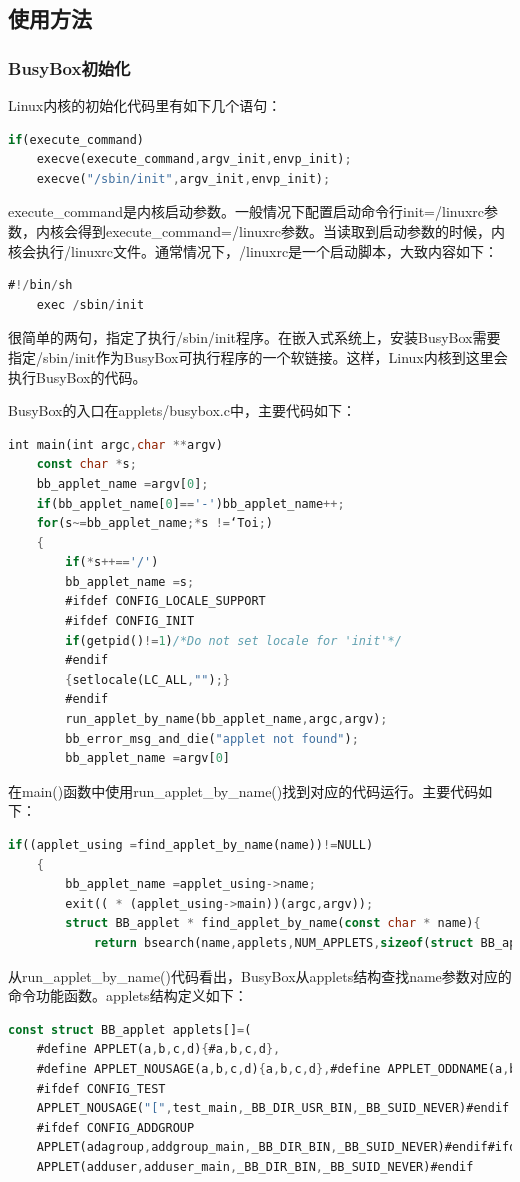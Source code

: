 \subsection{使用方法}
\subsubsection{BusyBox初始化}
Linux内核的初始化代码里有如下几个语句：
\begin{lstlisting}[language=Rust]
	if(execute_command)
	execve(execute_command,argv_init,envp_init);
	execve("/sbin/init",argv_init,envp_init);
\end{lstlisting}

execute\_command是内核启动参数。一般情况下配置启动命令行init=/linuxrc参数，内核会得到execute\_command=/linuxrc参数。当读取到启动参数的时候，内核会执行/linuxrc文件。通常情况下，/linuxrc是一个启动脚本，大致内容如下：
\begin{lstlisting}[language=Rust]
	#!/bin/sh
	exec /sbin/init
\end{lstlisting}

很简单的两句，指定了执行/sbin/init程序。在嵌入式系统上，安装BusyBox需要指定/sbin/init作为BusyBox可执行程序的一个软链接。这样，Linux内核到这里会执行BusyBox的代码。

BusyBox的入口在applets/busybox.c中，主要代码如下：
\begin{lstlisting}[language=Rust]
	int main(int argc,char **argv)
	const char *s;
	bb_applet_name =argv[0];
	if(bb_applet_name[0]=='-')bb_applet_name++;
	for(s~=bb_applet_name;*s !=‘Toi;)
	{
		if(*s++=='/')
		bb_applet_name =s;
		#ifdef CONFIG_LOCALE_SUPPORT
		#ifdef CONFIG_INIT
		if(getpid()!=1)/*Do not set locale for 'init'*/
		#endif
		{setlocale(LC_ALL,"");}
		#endif
		run_applet_by_name(bb_applet_name,argc,argv);
		bb_error_msg_and_die("applet not found");
		bb_applet_name =argv[0]
\end{lstlisting}

在main()函数中使用run\_applet\_by\_name()找到对应的代码运行。主要代码如下：
\begin{lstlisting}[language=Rust]
	if((applet_using =find_applet_by_name(name))!=NULL)
	{
		bb_applet_name =applet_using->name;
		exit(( * (applet_using->main))(argc,argv));
		struct BB_applet * find_applet_by_name(const char * name){
			return bsearch(name,applets,NUM_APPLETS,sizeof(struct BB_applet),applet_name_compare);
\end{lstlisting}

从run\_applet\_by\_name()代码看出，BusyBox从applets结构查找name参数对应的命令功能函数。applets结构定义如下：
\begin{lstlisting}[language=Rust]
	const struct BB_applet applets[]=(
	#define APPLET(a,b,c,d){#a,b,c,d},
	#define APPLET_NOUSAGE(a,b,c,d){a,b,c,d},#define APPLET_ODDNAME(a,b,c,d,e){a,b,c,d},
	#ifdef CONFIG_TEST
	APPLET_NOUSAGE("[",test_main,_BB_DIR_USR_BIN,_BB_SUID_NEVER)#endif
	#ifdef CONFIG_ADDGROUP
	APPLET(adagroup,addgroup_main,_BB_DIR_BIN,_BB_SUID_NEVER)#endif#ifdef CONFIG_ADDUSER
	APPLET(adduser,adduser_main,_BB_DIR_BIN,_BB_SUID_NEVER)#endif
\end{lstlisting}

